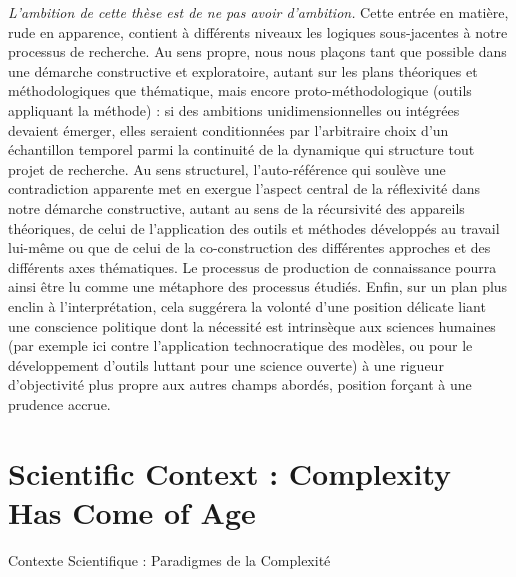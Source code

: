{
\emph{L'ambition de cette thèse est de ne pas avoir d'ambition.}
 Cette entrée en matière, rude en apparence, contient à différents niveaux les logiques sous-jacentes à notre processus de recherche. Au sens propre, nous nous plaçons tant que possible dans une démarche constructive et exploratoire, autant sur les plans théoriques et méthodologiques que thématique, mais encore proto-méthodologique (outils appliquant la méthode) : si des ambitions unidimensionnelles ou intégrées devaient émerger, elles seraient conditionnées par l'arbitraire choix d'un échantillon temporel parmi la continuité de la dynamique qui structure tout projet de recherche. Au sens structurel, l'auto-référence qui soulève une contradiction apparente met en exergue l'aspect central de la réflexivité dans notre démarche constructive, autant au sens de la récursivité des appareils théoriques, de celui de l'application des outils et méthodes développés au travail lui-même ou que de celui de la co-construction des différentes approches et des différents axes thématiques. Le processus de production de connaissance pourra ainsi être lu comme une métaphore des processus étudiés. Enfin, sur un plan plus enclin à l'interprétation, cela suggérera la volonté d'une position délicate liant une conscience politique dont la nécessité est intrinsèque aux sciences humaines (par exemple ici contre l'application technocratique des modèles, ou pour le développement d'outils luttant pour une science ouverte) à une rigueur d'objectivité plus propre aux autres champs abordés, position forçant à une prudence accrue.
}




\section*{Scientific Context : Complexity Has Come of Age}{Contexte Scientifique : Paradigmes de la Complexité}


